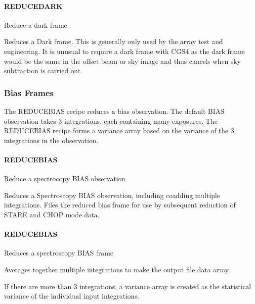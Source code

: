 \documentclass[twoside,11pt]{article}
\renewcommand{\_}{\texttt{\symbol{95}}}
\begin{document}
\paragraph{REDUCE\_DARK\label{REDUCE_DARK}}


Reduce a dark frame


\mbox{}


Reduces a Dark frame. This is generally only used by the array test
and engineering. It is unusual to require a dark frame with CGS4 as
the dark frame would be the same in the offset beam or sky image and
thus cancels when sky subtraction is carried out.


\subsubsection{Bias Frames}

The REDUCE\_BIAS recipe reduces a bias observation. The default BIAS
observation takes 3 integrations, each containing many exposures. The
REDUCE\_BIAS recipe forms a variance array based on the variance of the
3 integrations in the observation.


\paragraph{REDUCE\_BIAS\label{REDUCE_BIAS}}


Reduce a spectrocopy BIAS observation


\mbox{}


Reduces a Spectroscopy BIAS observation, including coadding multiple
integrations. Files the reduced bias frame for use by subsequent
reduction of STARE and CHOP mode data.


\paragraph{\_REDUCE\_BIAS\_\label{_REDUCE_BIAS_}}


Reduces a spectroscopy BIAS frame


\mbox{}


Averages together multiple integrations to make the output file data array.



If there are more than 3 integrations, a variance array is created as the
statistical variance of the individual input integrations.
\end{document}
